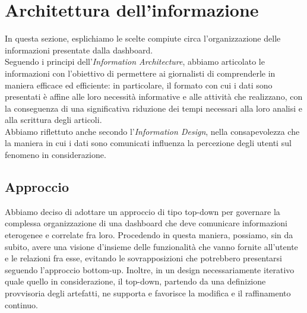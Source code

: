 \section{Architettura dell'informazione}
\label{s:architettura-informazione}

In questa sezione, esplichiamo le scelte compiute circa l'organizzazione delle informazioni presentate dalla dashboard.\\
Seguendo i principi dell'\textit{Information Architecture}, abbiamo articolato le informazioni con l'obiettivo di permettere ai giornalisti di comprenderle in maniera efficace ed efficiente: in particolare, il formato con cui i dati sono presentati è affine alle loro necessità informative e alle attività che realizzano, con la conseguenza di una significativa riduzione dei tempi necessari alla loro analisi e alla scrittura degli articoli.\\
\noindent
Abbiamo riflettuto anche secondo l'\textit{Information Design}, nella consapevolezza che la maniera in cui i dati sono comunicati influenza la percezione degli utenti sul fenomeno in considerazione.

\subsection{Approccio}
\label{ss:approccio}
Abbiamo deciso di adottare un approccio di tipo top-down per governare la complessa organizzazione di una dashboard che deve comunicare informazioni eterogenee e correlate fra loro.
Procedendo in questa maniera, possiamo, sin da subito, avere una visione d'insieme delle funzionalità che vanno fornite all'utente e le relazioni fra esse, evitando le sovrapposizioni che potrebbero presentarsi seguendo l'approccio bottom-up.
Inoltre, in un design necessariamente iterativo quale quello in considerazione, il top-down, partendo da una definizione provvisoria degli artefatti, ne supporta e favorisce la modifica e il raffinamento continuo.

